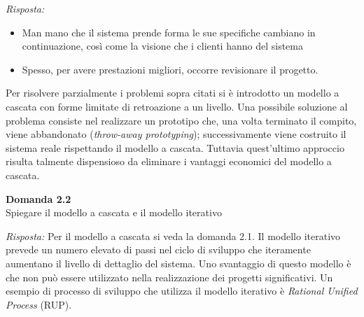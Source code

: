 \documentclass{article}
\newenvironment{problem}[2][Domanda]
    { \begin{mdframed}[backgroundcolor=gray!20] \textbf{#1 #2} \\}
    {  \end{mdframed}}
\newenvironment{solution}
    {\textit{Risposta:}}
    {}
\begin{document}
\begin{solution}
\begin{itemize}
	\item Man mano che il sistema prende forma le sue specifiche cambiano in continuazione, così come la visione che i clienti hanno del sistema
	\item Spesso, per avere prestazioni migliori, occorre revisionare il progetto.
\end{itemize}
Per risolvere parzialmente i problemi sopra citati si è introdotto un modello a cascata con forme limitate di retroazione a un livello.
Una possibile soluzione al problema consiste nel realizzare un prototipo che, una volta terminato il compito, viene abbandonato (\textit{throw-away prototyping}); successivamente viene costruito il sistema reale rispettando il modello a cascata.
\newline
Tuttavia quest'ultimo approccio risulta talmente dispensioso da eliminare i vantaggi economici del modello a cascata.
\end{solution}


\begin{problem}{2.2}
Spiegare il modello a cascata e il modello iterativo
\end{problem}
\begin{solution}
Per il modello a cascata si veda la domanda 2.1.
\newline
Il modello iterativo prevede un numero elevato di passi nel ciclo di sviluppo che iteramente aumentano il livello di dettaglio del sistema.
Uno svantaggio di questo modello è che non può essere utilizzato nella realizzazione dei progetti significativi.
Un esempio di processo di sviluppo che utilizza il modello iterativo è \textit{Rational Unified Process} (RUP).
\end{solution}
\end{document}
